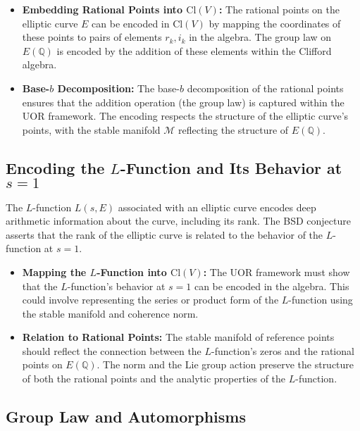 \documentclass[11pt]{article}
\begin{document}
\begin{itemize}
    \item \textbf{Embedding Rational Points into \(\mathrm{Cl}(V)\):} The rational points on the elliptic curve \(E\) can be encoded in \(\mathrm{Cl}(V)\) by mapping the coordinates of these points to pairs of elements \(r_k, i_k\) in the algebra. The group law on \(E(\mathbb{Q})\) is encoded by the addition of these elements within the Clifford algebra.
    \item \textbf{Base-\(b\) Decomposition:} The base-\(b\) decomposition of the rational points ensures that the addition operation (the group law) is captured within the UOR framework. The encoding respects the structure of the elliptic curve’s points, with the stable manifold \(\mathcal{M}\) reflecting the structure of \(E(\mathbb{Q})\).
\end{itemize}

\subsection{Encoding the \(L\)-Function and Its Behavior at \(s = 1\)}

The \(L\)-function \(L(s, E)\) associated with an elliptic curve encodes deep arithmetic information about the curve, including its rank. The BSD conjecture asserts that the rank of the elliptic curve is related to the behavior of the \(L\)-function at \(s = 1\).

\begin{itemize}
    \item \textbf{Mapping the \(L\)-Function into \(\mathrm{Cl}(V)\):} The UOR framework must show that the \(L\)-function’s behavior at \(s = 1\) can be encoded in the algebra. This could involve representing the series or product form of the \(L\)-function using the stable manifold and coherence norm.
    \item \textbf{Relation to Rational Points:} The stable manifold of reference points should reflect the connection between the \(L\)-function’s zeros and the rational points on \(E(\mathbb{Q})\). The norm and the Lie group action preserve the structure of both the rational points and the analytic properties of the \(L\)-function.
\end{itemize}

\subsection{Group Law and Automorphisms}
\end{document}
